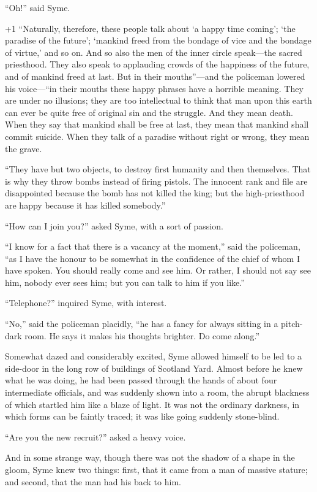 “Oh!” said Syme.

\looseness+1
“Naturally, therefore, these people talk about ‘a happy time coming’; ‘the paradise of the future’; ‘mankind freed from the bondage of vice and the bondage of virtue,’ and so on. And so also the men of the inner circle speak⁠—the sacred priesthood. They also speak to applauding crowds of the happiness of the future, and of mankind freed at last. But in their mouths”⁠—and the policeman lowered his voice⁠—“in their mouths these happy phrases have a horrible meaning. They are under no illusions; they are too intellectual to think that man upon this earth can ever be quite free of original sin and the struggle. And they mean death. When they say that mankind shall be free at last, they mean that mankind shall commit suicide. When they talk of a paradise without right or wrong, they mean the grave.

“They have but two objects, to destroy first humanity and then themselves. That is why they throw bombs instead of firing pistols. The innocent rank and file are disappointed because the bomb has not killed the king; but the high-priesthood are happy because it has killed somebody.”

“How can I join you?” asked Syme, with a sort of passion.

“I know for a fact that there is a vacancy at the moment,” said the policeman, “as I have the honour to be somewhat in the confidence of the chief of whom I have spoken. You should really come and see him. Or rather, I should not say see him, nobody ever sees him; but you can talk to him if you like.”

“Telephone?” inquired Syme, with interest.

“No,” said the policeman placidly, “he has a fancy for always sitting in a pitch-dark room. He says it makes his thoughts brighter. Do come along.”

Somewhat dazed and considerably excited, Syme allowed himself to be led to a side-door in the long row of buildings of Scotland Yard. Almost before he knew what he was doing, he had been passed through the hands of about four intermediate officials, and was suddenly shown into a room, the abrupt blackness of which startled him like a blaze of light. It was not the ordinary darkness, in which forms can be faintly traced; it was like going suddenly stone-blind.

“Are you the new recruit?” asked a heavy voice.

And in some strange way, though there was not the shadow of a shape in the gloom, Syme knew two things: first, that it came from a man of massive stature; and second, that the man had his back to him.

